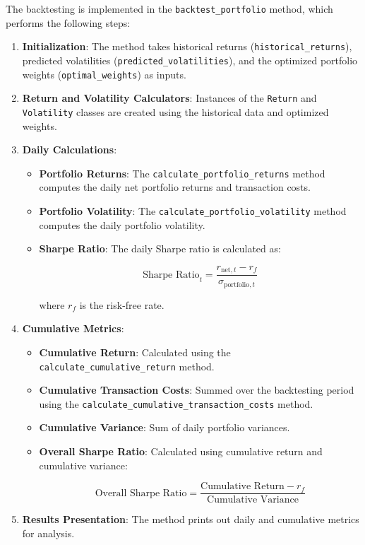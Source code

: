 The backtesting is implemented in the \texttt{backtest\_portfolio} method, which performs the following steps:

\begin{enumerate}
    \item \textbf{Initialization}: The method takes historical returns (\texttt{historical\_returns}), predicted volatilities (\texttt{predicted\_volatilities}), and the optimized portfolio weights (\texttt{optimal\_weights}) as inputs.
    \item \textbf{Return and Volatility Calculators}: Instances of the \texttt{Return} and \texttt{Volatility} classes are created using the historical data and optimized weights.
    \item \textbf{Daily Calculations}:
    \begin{itemize}
        \item \textbf{Portfolio Returns}: The \texttt{calculate\_portfolio\_returns} method computes the daily net portfolio returns and transaction costs.
        \item \textbf{Portfolio Volatility}: The \texttt{calculate\_portfolio\_volatility} method computes the daily portfolio volatility.
        \item \textbf{Sharpe Ratio}: The daily Sharpe ratio is calculated as:

        \[
        \text{Sharpe Ratio}_t = \frac{r_{\text{net}, t} - r_f}{\sigma_{\text{portfolio}, t}}
        \]

        where \( r_f \) is the risk-free rate.
    \end{itemize}
    \item \textbf{Cumulative Metrics}:
    \begin{itemize}
        \item \textbf{Cumulative Return}: Calculated using the \texttt{calculate\_cumulative\_return} method.
        \item \textbf{Cumulative Transaction Costs}: Summed over the backtesting period using the \texttt{calculate\_cumulative\_transaction\_costs} method.
        \item \textbf{Cumulative Variance}: Sum of daily portfolio variances.
        \item \textbf{Overall Sharpe Ratio}: Calculated using cumulative return and cumulative variance:

        \[
        \text{Overall Sharpe Ratio} = \frac{\text{Cumulative Return} - r_f}{\text{Cumulative Variance}}
        \]
    \end{itemize}
    \item \textbf{Results Presentation}: The method prints out daily and cumulative metrics for analysis.
\end{enumerate}

